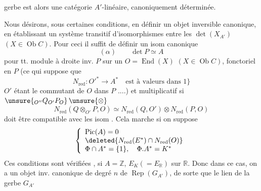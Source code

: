 
 gerbe est alors une catégorie $A'$-linéaire, canoniquement déterminée.


Nous désirons, sous certaines conditions, en définir un objet inversible canonique, en établissant un système transitif d'isomorphismes entre les $\det(X_{A'})$ $(X\in\operatorname{Ob}C)$. Pour ceci il suffit de définir un isom canonique
\[
(\alpha)\qquad \det P\simeq A
\]
pour tt. module à droite inv. $P$ sur un $O=\operatorname{End}(X)$ $(X\in\operatorname{Ob}C)$, fonctoriel en $P$ (ce qui suppose que
\[
N_{\mathrm{red}}:O'^*\longrightarrow A^*\quad\text{est à valeurs dans }1\}
\]
$O'$ étant le commutant de $O$ dans $P$ ....) et multiplicatif si $\unsure{{}_{O''}Q_{O'}P_O}\,\unsure{\otimes}$
\[
N_{\mathrm{red}}(Q\otimes_{O'}P,O)\simeq N_{\mathrm{red}}(Q,O')\otimes N_{\mathrm{red}}(P,O)
\]
doit être compatible avec les isom . Cela marche si on suppose
\margin{[posant $\Phi=N_{\mathrm{red}}(E^*)\subset K^*$, où $O=\operatorname{End}(X)$, $E=O\otimes_A K$]}
\[
\left\{\begin{array}{l}
\operatorname{Pic}(A)=0\\
\deleted{N_{\mathrm{red}}(E^*)\cap N_{\mathrm{red}}(O)}\\
\Phi\cap A^*=\{1\},\quad \Phi.A^*=K^*
\end{array}\right.
\]
Ces conditions sont vérifiées  , si $A=\mathbb Z$, $E_K(=E_{\mathbb R})$  sur $\mathbb R$. Donc dans ce cas, on a un objet inv. canonique de degré $n$ de $\operatorname{Rep}(G_{A'})$, de sorte que le lien  de la gerbe $G_{A'}$

